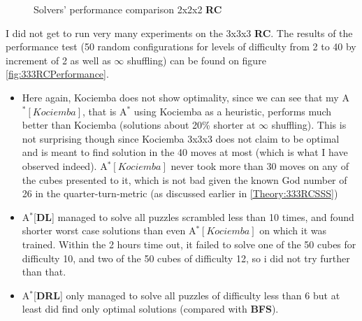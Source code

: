 \begin{figure}[H]
  \noindent
  \caption[222RCPerformance]{Solvers' performance comparison 2x2x2 \textbf{RC}}
  \label{fig:222RCPerformance}
\end{figure}



\label{sec:ResRubiks333}

I did not get to run very many experiments on the 3x3x3 \textbf{RC}. The results of the performance test (50 random configurations for levels of difficulty from 2 to 40 by increment of 2 as well as $\infty$ shuffling) can be found on figure \ref{fig:333RCPerformance}.
\begin{itemize}
\item Here again, Kociemba does not show optimality, since we can see that my A$^{*}[Kociemba]$, that is A$^{*}$ using Kociemba as a heuristic, performs much better than Kociemba (solutions about 20\% shorter at $\infty$ shuffling). This is not surprising though since Kociemba 3x3x3 does not claim to be optimal and is meant to find solution in the 40 moves at most (which is what I have observed indeed). A$^{*}[Kociemba]$ never took more than 30 moves on any of the cubes presented to it, which is not bad given the known God number of 26 in the quarter-turn-metric (as discussed earlier in \ref{Theory:333RCSSS})
\item A$^{*}$[\textbf{DL}] managed to solve all puzzles scrambled less than 10 times, and found shorter worst case solutions than even A$^{*}[Kociemba]$ on which it was trained. Within the 2 hours time out, it failed to solve one of the 50 cubes for difficulty 10, and two of the 50 cubes of difficulty 12, so i did not try further than that.
\item A$^{*}$[\textbf{DRL}] only managed to solve all puzzles of difficulty less than 6 but at least did find only optimal solutions (compared with \textbf{BFS}).
\end{itemize}


